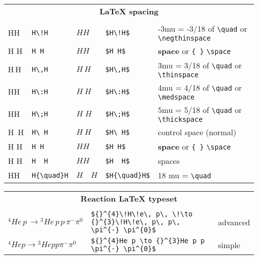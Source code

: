 \documentclass{article}
\begin{document}
\pagestyle{empty}
\centering

\begin{tabular}{lllll}
  \multicolumn{5}{c}{\textbf{LaTeX spacing}} \\ \\
  H\!H & \verb*|H\!H| & $H\!H$ & \verb*|$H\!H$|
  & -3mu = -3/18 of \verb*|\quad| or \verb*|\negthinspace| \\
  H H  & \verb*|H H|  & $H H$  & \verb*|$H H$|
  & \textbf{space} or \verb*|{ }| \verb*|\space| \\
  H\,H & \verb*|H\,H| & $H\,H$ & \verb*|$H\,H$|
  & 3mu = 3/18 of \verb*|\quad| or \verb*|\thinspace| \\
  H\:H & \verb*|H\:H| & $H\:H$ & \verb*|$H\:H$|
  & 4mu = 4/18 of \verb*|\quad| or \verb*|\medspace| \\
  H\;H & \verb*|H\;H| & $H\;H$ & \verb*|$H\;H$|
  & 5mu = 5/18 of \verb*|\quad| or \verb*|\thickspace| \\
  H\ H & \verb*|H\ H| & $H\ H$ & \verb*|$H\ H$|
  & control space (normal) \\
  H H  & \verb*|H H|  & $H H$  & \verb*|$H H$|
  & \textbf{space} or \verb*|{ }| \verb*|\space| \\
  H  H & \verb*|H  H| & $H  H$ & \verb*|$H  H$|
  & spaces \\
  H{\quad}H & \verb*|H{\quad}H| & $H{\quad}H$
  & \verb*|$H{\quad}H$| & 18 mu = \verb*|\quad|
\end{tabular}
\vspace{2em}

\begin{tabular}{lll}
  \multicolumn{3}{c}{\textbf{Reaction LaTeX typeset}} \\ \\
  ${}^{4}\!H\!e\, p\, \!\to {}^{3}\!H\!e\, p\, p\, \pi^{-} \pi^{0}$ &
  \verb*|${}^{4}\!H\!e\, p\, \!\to {}^{3}\!H\!e\, p\, p\, \pi^{-} \pi^{0}$| & {\color{red} advanced} \\
  ${}^{4}He p \to {}^{3}He p p \pi^{-} \pi^{0}$ &
  \verb*|${}^{4}He p \to {}^{3}He p p \pi^{-} \pi^{0}$| & simple \\
\end{tabular}
\vspace{2em}
\end{document}
